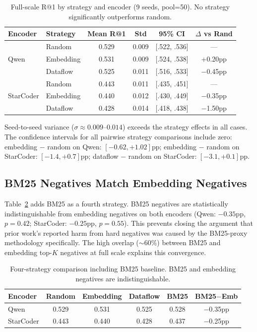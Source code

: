 \documentclass[11pt,a4paper]{article}
\begin{document}
\begin{table}[t]
\centering
\caption{Full-scale R@1 by strategy and encoder (9 seeds, pool=50). No strategy significantly outperforms random.}
\label{tab:main}
\small
\begin{tabular}{llcccc}
\toprule
\textbf{Encoder} & \textbf{Strategy} & \textbf{Mean R@1} & \textbf{Std} & \textbf{95\% CI} & \textbf{$\Delta$ vs Rand} \\
\midrule
\multirow{3}{*}{Qwen} & Random & 0.529 & 0.009 & [.522, .536] & --- \\
 & Embedding & 0.531 & 0.009 & [.524, .538] & +0.20pp \\
 & Dataflow & 0.525 & 0.011 & [.516, .533] & $-$0.45pp \\
\midrule
\multirow{3}{*}{StarCoder} & Random & 0.443 & 0.011 & [.435, .451] & --- \\
 & Embedding & 0.440 & 0.012 & [.430, .449] & $-$0.35pp \\
 & Dataflow & 0.428 & 0.014 & [.418, .438] & $-$1.50pp \\
\bottomrule
\end{tabular}
\end{table}

Seed-to-seed variance ($\sigma \approx 0.009$--$0.014$) exceeds the strategy effects in all cases.
The confidence intervals for all pairwise strategy comparisons include zero:
embedding $-$ random on Qwen: $[-0.62, +1.02]$pp;
embedding $-$ random on StarCoder: $[-1.4, +0.7]$pp;
dataflow $-$ random on StarCoder: $[-3.1, +0.1]$pp.

\subsection{BM25 Negatives Match Embedding Negatives}
\label{sec:bm25}

Table~\ref{tab:bm25} adds BM25 as a fourth strategy.
BM25 negatives are statistically indistinguishable from embedding negatives on both encoders (Qwen: $-0.35$pp, $p=0.42$; StarCoder: $-0.25$pp, $p=0.55$).
This prevents closing the argument that prior work's reported harm from hard negatives was caused by the BM25-proxy methodology specifically.
The high overlap ($\sim$60\%) between BM25 and embedding top-$K$ negatives at full scale explains this convergence.

\begin{table}[t]
\centering
\caption{Four-strategy comparison including BM25 baseline. BM25 and embedding negatives are indistinguishable.}
\label{tab:bm25}
\small
\begin{tabular}{lccccc}
\toprule
\textbf{Encoder} & \textbf{Random} & \textbf{Embedding} & \textbf{Dataflow} & \textbf{BM25} & \textbf{BM25$-$Emb} \\
\midrule
Qwen & 0.529 & 0.531 & 0.525 & 0.528 & $-$0.35pp \\
StarCoder & 0.443 & 0.440 & 0.428 & 0.437 & $-$0.25pp \\
\bottomrule
\end{tabular}
\end{table}
\end{document}
